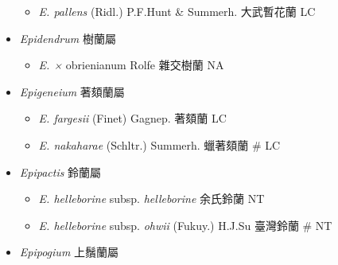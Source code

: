 \begin{itemize}
  \begin{itemize}
        \item[] \textit{E. pallens} (Ridl.) P.F.Hunt \& Summerh.  大武暫花蘭   LC
  \end{itemize}
 \item[] \textit{Epidendrum} 樹蘭屬
                                
  \begin{itemize}
        \item[] \textit{E. ×} obrienianum \textit{} Rolfe  雜交樹蘭   NA
  \end{itemize}
 \item[] \textit{Epigeneium} 著頦蘭屬
                                
  \begin{itemize}
        \item[] \textit{E. fargesii} (Finet) Gagnep.  著頦蘭   LC
        \item[] \textit{E. nakaharae} (Schltr.) Summerh.  蠟著頦蘭  \# LC
  \end{itemize}
 \item[] \textit{Epipactis} 鈴蘭屬
                                
  \begin{itemize}
        \item[] \textit{E. helleborine} subsp. \textit{helleborine}   余氏鈴蘭   NT
        \item[] \textit{E. helleborine} subsp. \textit{ohwii} (Fukuy.) H.J.Su  臺灣鈴蘭  \# NT
  \end{itemize}
 \item[] \textit{Epipogium} 上鬚蘭屬
                                

\end{itemize}
